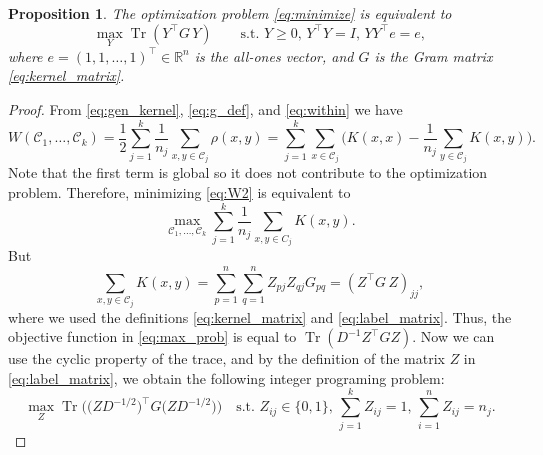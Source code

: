 \documentclass[aps,preprint,nofootinbib,floatfix]{revtex4-1}
\newtheorem{proposition}[theorem]{Proposition}
\DeclareMathOperator{\Tr}{Tr}
\newcommand\kk{K}
\newcommand\C{{\mathcal{C}}}
\newcommand\Zt{Y}
\newcommand\e{e}
\begin{document}
\begin{proposition} 
\label{th:qcqp2}
The optimization problem \eqref{eq:minimize} is equivalent to
\begin{equation}
\label{eq:qcqp2}
\max_{\Zt} \Tr \left( \Zt^\top G \, \Zt \right)  \qquad
\mbox{s.t. $\Zt \ge 0$, $\Zt^\top \Zt = I$, 
$\Zt \Zt^\top \e = \e$},
\end{equation}
where $\e = (1,1,\dots,1)^\top \in \mathbb{R}^n$ is the all-ones vector,
and $G$ is the Gram matrix \eqref{eq:kernel_matrix}.
\end{proposition}
\begin{proof}
From 
\eqref{eq:gen_kernel},
\eqref{eq:g_def}, and
\eqref{eq:within}
we have
\begin{equation}
\label{eq:W2}
W(\C_1,\dotsc,\C_k  )
= \dfrac{1}{2} \sum_{j=1}^k \dfrac{1}{n_j} \sum_{x,y \in \C_j} \rho(x,y)
= \sum_{j=1}^k \sum_{x \in \C_j}  \bigg(
\kk(x,x) - \dfrac{1}{n_j} \sum_{y \in \C_j} \kk(x,y) \bigg).
\end{equation}
Note that the first term is global so it does not contribute to the 
optimization problem.
Therefore, minimizing \eqref{eq:W2} is equivalent to
\begin{equation}
\label{eq:max_prob}
\max_{ \C_1,\dotsc,\C_k } 
\sum_{j=1}^k \dfrac{1}{n_j} \sum_{x,y\in C_j} \kk(x,y) .
\end{equation}
But 
\begin{equation}
\sum_{x, y \in \C_j} \kk(x, y) =
\sum_{p=1}^{n} \sum_{q=1}^{n} Z_{pj} Z_{qj} G_{pq} = 
(Z^\top G \, Z)_{jj},
\end{equation}
where we used the definitions \eqref{eq:kernel_matrix} and
\eqref{eq:label_matrix}. Thus, the objective function in 
\eqref{eq:max_prob} is equal to
$\Tr \left( D^{-1} Z^\top G Z \right)$. 
Now we can
use the cyclic property
of the trace, and by the  definition of the matrix $Z$
in \eqref{eq:label_matrix}, we obtain the following integer
programing problem:
\begin{equation}\label{eq:qcqp}
\max_{Z} \Tr\Big( \big( Z D^{-1/2}\big)^\top G 
\big( ZD^{-1/2} \big) 
\Big) \quad
\mbox{s.t. $Z_{ij} \in \{0,1\}$, $\sum_{j=1}^k Z_{ij} = 1$, 
$\sum_{i=1}^n Z_{ij} = n_j$.}
\end{equation}


\end{proof}
\end{document}
